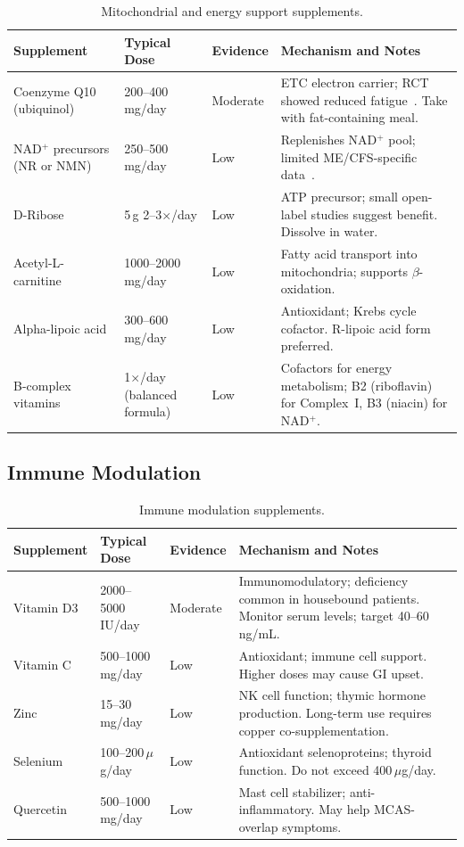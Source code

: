 \begin{table}[htbp]
\centering
\caption{Mitochondrial and energy support supplements.}
\label{tab:mito-supplements}
\small
\begin{tabular}{p{2.8cm}p{2.5cm}p{1.5cm}p{4.5cm}}
\hline
\textbf{Supplement} & \textbf{Typical Dose} & \textbf{Evidence} & \textbf{Mechanism and Notes} \\
\hline
Coenzyme Q10 (ubiquinol) & 200--400\,mg/day & Moderate & ETC electron carrier; RCT showed reduced fatigue~\cite{CastroMarrero2021CoQ10}. Take with fat-containing meal. \\
NAD$^+$ precursors (NR or NMN) & 250--500\,mg/day & Low & Replenishes NAD$^+$ pool; limited ME/CFS-specific data~\cite{syed2025nad_therapy}. \\
D-Ribose & 5\,g 2--3$\times$/day & Low & ATP precursor; small open-label studies suggest benefit. Dissolve in water. \\
Acetyl-L-carnitine & 1000--2000\,mg/day & Low & Fatty acid transport into mitochondria; supports $\beta$-oxidation. \\
Alpha-lipoic acid & 300--600\,mg/day & Low & Antioxidant; Krebs cycle cofactor. R-lipoic acid form preferred. \\
B-complex vitamins & 1$\times$/day (balanced formula) & Low & Cofactors for energy metabolism; B2 (riboflavin) for Complex~I, B3 (niacin) for NAD$^+$. \\
\hline
\end{tabular}
\end{table}

\subsection{Immune Modulation}

\begin{table}[htbp]
\centering
\caption{Immune modulation supplements.}
\label{tab:immune-supplements}
\small
\begin{tabular}{p{2.8cm}p{2.5cm}p{1.5cm}p{4.5cm}}
\hline
\textbf{Supplement} & \textbf{Typical Dose} & \textbf{Evidence} & \textbf{Mechanism and Notes} \\
\hline
Vitamin D3 & 2000--5000\,IU/day & Moderate & Immunomodulatory; deficiency common in housebound patients. Monitor serum levels; target 40--60\,ng/mL. \\
Vitamin C & 500--1000\,mg/day & Low & Antioxidant; immune cell support. Higher doses may cause GI upset. \\
Zinc & 15--30\,mg/day & Low & NK cell function; thymic hormone production. Long-term use requires copper co-supplementation. \\
Selenium & 100--200\,$\mu$g/day & Low & Antioxidant selenoproteins; thyroid function. Do not exceed 400\,$\mu$g/day. \\
Quercetin & 500--1000\,mg/day & Low & Mast cell stabilizer; anti-inflammatory. May help MCAS-overlap symptoms. \\
\hline
\end{tabular}
\end{table}

